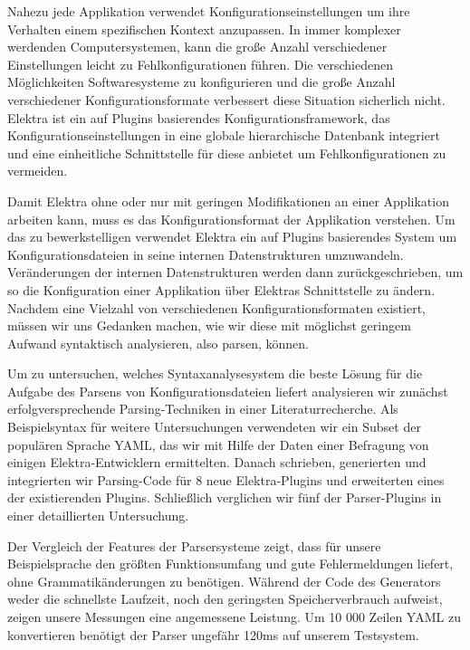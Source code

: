 \begin{kurzfassung}
\begin{sloppypar}
Nahezu jede Applikation verwendet Konfigurationseinstellungen um ihre Verhalten einem spezifischen Kontext anzupassen. In immer komplexer werdenden Computersystemen, kann die große Anzahl verschiedener Einstellungen leicht zu Fehlkonfigurationen führen. Die verschiedenen Möglichkeiten Softwaresysteme zu konfigurieren und die große Anzahl verschiedener Konfigurationsformate verbessert diese Situation sicherlich nicht. Elektra ist ein auf Plugins basierendes Konfigurationsframework, das Konfigurationseinstellungen in eine globale hierarchische Datenbank integriert und eine einheitliche Schnittstelle für diese anbietet um Fehlkonfigurationen zu vermeiden.
\end{sloppypar}

Damit Elektra ohne oder nur mit geringen Modifikationen an einer Applikation arbeiten kann, muss es das Konfigurationsformat der Applikation verstehen. Um das zu bewerkstelligen verwendet Elektra ein auf Plugins basierendes System um Konfigurationsdateien in seine internen Datenstrukturen umzuwandeln. Veränderungen der internen Datenstrukturen werden dann zurückgeschrieben, um so die Konfiguration einer Applikation über Elektras Schnittstelle zu ändern. Nachdem eine Vielzahl von verschiedenen Konfigurationsformaten existiert, müssen wir uns Gedanken machen, wie wir diese mit möglichst geringem Aufwand syntaktisch analysieren, also parsen, können.

\begin{sloppypar}
Um zu untersuchen, welches Syntaxanalysesystem die beste Lösung für die Aufgabe des Parsens von Konfigurationsdateien liefert analysieren wir zunächst  erfolgversprechende Parsing-Techniken in einer Literaturrecherche. Als Beispielsyntax für weitere Untersuchungen verwendeten wir ein Subset der populären Sprache YAML, das wir mit Hilfe der Daten einer Befragung von einigen Elektra-Entwicklern ermittelten. Danach schrieben, generierten und integrierten wir Parsing-Code für 8 neue Elektra-Plugins und erweiterten eines der existierenden Plugins. Schließlich verglichen wir fünf der Parser-Plugins in einer detaillierten Untersuchung.
\end{sloppypar}

Der Vergleich der Features der Parsersysteme zeigt, dass für unsere Beispielsprache  den größten Funktionsumfang und gute Fehlermeldungen liefert, ohne Grammatikänderungen zu benötigen. Während der Code des Generators weder die schnellste Laufzeit, noch den geringsten Speicherverbrauch aufweist, zeigen unsere Messungen eine angemessene Leistung. Um 10 000 Zeilen YAML zu konvertieren benötigt der Parser ungefähr 120ms auf unserem Testsystem.
\end{kurzfassung}
